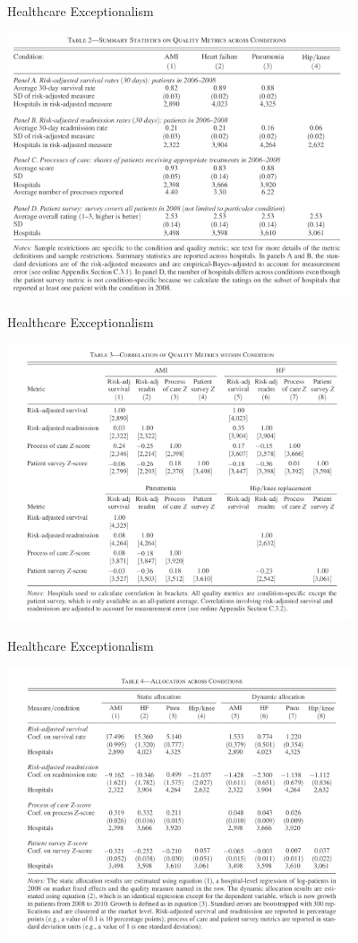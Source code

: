 \documentclass[xcolor=pdftex,dvipsnames,table,mathserif,aspectratio=169]{beamer}
\begin{document}
\begin{frame}{Healthcare Exceptionalism}
\begin{center}
\includegraphics[width=4in]{./resources/hc2.png}
\end{center}
\end{frame}

\begin{frame}{Healthcare Exceptionalism}
\begin{center}
\includegraphics[width=4in]{./resources/hc3.png}
\end{center}
\end{frame}

\begin{frame}{Healthcare Exceptionalism}
\begin{center}
\includegraphics[width=4in]{./resources/hc4.png}
\end{center}
\end{frame}
\end{document}

